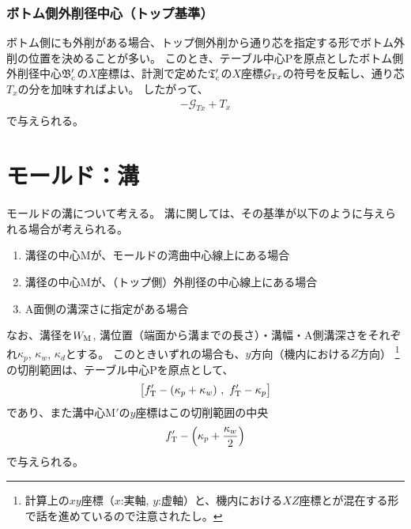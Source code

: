 \subsection{ボトム側外削径中心（トップ基準）}
ボトム側にも外削がある場合、トップ側外削から通り芯を指定する形でボトム外削の位置を決めることが多い。
このとき、テーブル中心Pを原点としたボトム側外削径中心$\mathfrak B_\text c'$の$X$座標は、計測で定めた$\mathfrak T_\text c'$の$X$座標$\mathcal G_{\text Tx}$の符号を反転し、通り芯$T_x$の分を加味すればよい。
したがって、
\begin{align*}
  -\mathcal G_{Tx}+T_x
\end{align*}
で与えられる。





\chapter{モールド：溝}
モールドの溝について考える。
溝に関しては、その基準が以下のように与えられる場合が考えられる。
\begin{enumerate}
\item 溝径の中心Mが、モールドの湾曲中心線上にある場合
\item 溝径の中心Mが、（トップ側）外削径の中心線上にある場合
\item A面側の溝深さに指定がある場合
\end{enumerate}
なお、溝径を$W_\text M$, 溝位置（端面から溝までの長さ）・溝幅・A側溝深さをそれぞれ$\kappa_p$, $\kappa_w$, $\kappa_d$とする。
このときいずれの場合も、$y$方向（機内における$Z$方向）
\footnote{計算上の$xy$座標（$x$:実軸, $y$:虚軸）と、機内における$XZ$座標とが混在する形で話を進めているので注意されたし。}\relax
の切削範囲は、テーブル中心Pを原点として、
\begin{align*}
  \big[f_\text T'-(\kappa_p+\kappa_w)\ ,\ f_\text T'-\kappa_p\big]
\end{align*}
であり、また溝中心M$'$の$y$座標はこの切削範囲の中央
\begin{align*}
  f_\text T'-\left(\kappa_p+\frac{\kappa_w}2\right)
\end{align*}
で与えられる。



